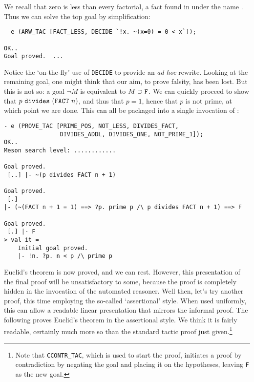     We recall that zero is less than every factorial, a fact found in
     under the name . Thus we can
    solve the top goal by simplification:
\begin{session}\begin{verbatim}
- e (ARW_TAC [FACT_LESS, DECIDE `!x. ~(x=0) = 0 < x`]);

OK..
Goal proved.  ...
\end{verbatim}\end{session}
Notice the `on-the-fly' use of \verb+DECIDE+ to provide an {\it ad hoc\/}
rewrite. Looking at the remaining goal, one might think that our aim, to
prove falsity, has been lost. But this is not so: a goal $\neg
M$ is equivalent to $M \supset \mbox{\tt F}$. We can quickly proceed to
show that $p \ \mbox{\tt divides}\ (\mbox{\tt FACT}\ n)$, and thus that
$p = 1$, hence that $p$ is not prime, at which point we are done. This
can all be packaged into a single invocation of :
\begin{session}\begin{verbatim}
- e (PROVE_TAC [PRIME_POS, NOT_LESS, DIVIDES_FACT,
                DIVIDES_ADDL, DIVIDES_ONE, NOT_PRIME_1]);
OK..
Meson search level: ............

Goal proved.
 [..] |- ~(p divides FACT n + 1)

Goal proved.
 [.]
|- (~(FACT n + 1 = 1) ==> ?p. prime p /\ p divides FACT n + 1) ==> F

Goal proved.
 [.] |- F
> val it =
    Initial goal proved.
    |- !n. ?p. n < p /\ prime p
\end{verbatim}\end{session}
    Euclid's theorem is now proved, and we can rest. However, this
    presentation of the final proof will be unsatisfactory to some,
    because the proof is completely hidden in the invocation of the
    automated reasoner. Well then, let's try another proof, this time
    employing the so-called `assertional' style. When used uniformly,
    this can allow a readable linear presentation that mirrors the
    informal proof. The following proves Euclid's theorem in the
    assertional style. We think it is fairly readable, certainly much
    more so than the standard tactic proof just given.\footnote{Note
      that {\tt CCONTR\_TAC}, which is used to start the proof,
      initiates a proof by contradiction by negating the goal and
      placing it on the hypotheses, leaving {\tt F} as the new goal.}

